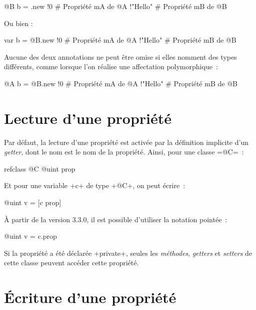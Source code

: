 \begin{galgas3}
@B b = .new {
  !0 # Propriété mA de @A
  !"Hello" # Propriété mB de @B
}
\end{galgas3}

Ou bien :
\begin{galgas3}
var b = @B.new {
  !0 # Propriété mA de @A
  !"Hello" # Propriété mB de @B
}
\end{galgas3}

Aucune des deux annotations ne peut être omise si elles nomment des types différents, comme lorsque l'on réalise une affectation polymorphique~:

\begin{galgas3}
@A b = @B.new {
  !0 # Propriété mA de @A
  !"Hello" # Propriété mB de @B
}
\end{galgas3}








\section{Lecture d'une propriété}

Par défaut, la lecture d'une propriété est activée par la définition implicite d'un \emph{getter}, dont le nom est le nom de la propriété. Ainsi, pour une classe \ggst=@C=~:

\begin{galgas3}
refclass @C {
  @uint prop
}
\end{galgas3}

Et pour une variable \ggst+c+ de type \ggst+@C+, on peut écrire~:

\begin{galgas3}
@uint v = [c prop]
\end{galgas3}

À partir de la version 3.3.0, il est possible d'utiliser la notation pointée~:
\begin{galgas3}
@uint v = c.prop
\end{galgas3}

Si la propriété a été déclarée \ggst+private+, seules les \emph{méthodes}, \emph{getters} et \emph{setters} de cette classe peuvent accéder cette propriété.








\section{Écriture d'une propriété}

